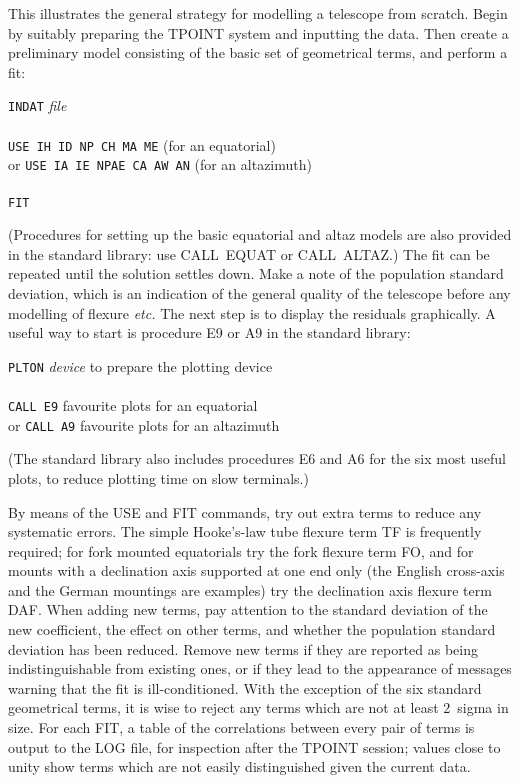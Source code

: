 This illustrates the general strategy for modelling a telescope
from scratch.  Begin by suitably preparing the TPOINT system
and inputting the data.
Then create a preliminary model consisting of the basic set
of geometrical terms, and perform a fit:
\begin{cmnds}
\> \> {\tt INDAT} {\it file} \\ \\
\> \> {\tt USE IH ID NP CH MA ME} \> (for an equatorial) \\
\> or \> {\tt USE IA IE NPAE CA AW AN} \> (for an altazimuth) \\ \\
\> \> {\tt FIT}
\end{cmnds}
(Procedures for setting up the basic equatorial
and altaz models are also provided in the
standard library: use CALL~EQUAT or CALL~ALTAZ.)
The fit can be repeated until the solution settles down.
Make a note of the population
standard deviation, which is an indication of the general quality
of the telescope before any modelling of flexure {\it etc.} The
next step is to display the residuals graphically.  A useful
way to start is procedure E9 or A9 in the standard library:
\begin{cmnds}
\> \> {\tt PLTON} {\it device} \> to prepare the plotting device \\ \\
\> \> {\tt CALL E9}  favourite plots for an equatorial \\
\> or \> {\tt CALL A9}  favourite plots for an altazimuth
\end{cmnds}
(The standard library also includes procedures E6 and A6 for the six most
useful plots, to reduce plotting time on slow terminals.)

By means of the USE and FIT
commands, try out extra terms to reduce any systematic errors.  The
simple Hooke's-law tube flexure term TF is frequently required;
for fork mounted equatorials try the fork flexure term FO,
and for mounts with a declination axis supported at one end
only (the English cross-axis and the German mountings are
examples) try the declination axis flexure term DAF.
When adding new terms, pay attention to the standard deviation of
the new coefficient, the effect on other terms, and whether
the population standard deviation has been reduced.  Remove
new terms if they are reported as being indistinguishable
from existing ones, or if they lead to the appearance of
messages warning that the fit is ill-conditioned.  With the
exception of the six standard geometrical terms, it is wise
to reject any terms which are not at least 2~sigma in
size.
For each FIT, a table of the correlations between every
pair of terms is output to the LOG file, for inspection after the
TPOINT session;  values close to unity show terms which are
not easily distinguished given the current data.

